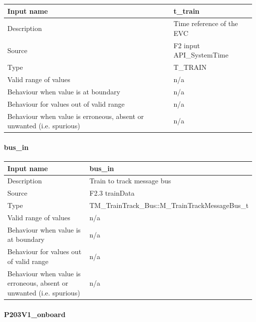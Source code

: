 \begin{longtable}{p{}p{}}
\toprule
Input name				& t\_train\\
\midrule
Description				& Time reference of the EVC  \\
\midrule
Source					& F2 input API\_SystemTime\\ 
\midrule
Type					& T\_TRAIN\\
\midrule
Valid range of values	& n/a \\
\midrule
Behaviour when value is at boundary	& n/a\\
\midrule
Behaviour for values out of valid range	& n/a\\
\midrule
Behaviour when value is erroneous, absent or unwanted (i.e. spurious) & n/a\\

\bottomrule


\end{longtable}


\paragraph{bus\_in}

\begin{longtable}{p{}p{}}
\toprule
Input name				& bus\_in\\
\midrule
Description				& Train to track message bus  \\
\midrule
Source					& F2.3 trainData\\ 
\midrule
Type					& TM\_TrainTrack\_Bus::M\_TrainTrackMessageBus\_t\\
\midrule
Valid range of values	& n/a \\
\midrule
Behaviour when value is at boundary	& n/a\\
\midrule
Behaviour for values out of valid range	& n/a\\
\midrule
Behaviour when value is erroneous, absent or unwanted (i.e. spurious) & n/a\\

\bottomrule


\end{longtable}




\paragraph{P203V1\_onboard}

